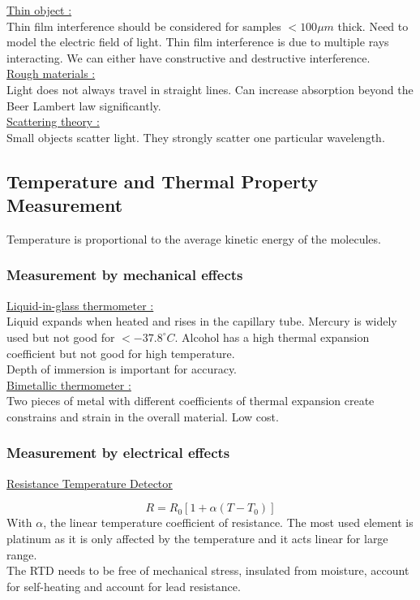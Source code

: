 \documentclass[../main.tex]{subfiles}
\begin{document}
\quad \underline{Thin object :}\\
Thin film interference should be considered for samples $<100 \mu m$ thick. Need to model the electric field of light. Thin film interference is due to multiple rays interacting. We can either have constructive and destructive interference.\\

\quad \underline{Rough materials :}\\
Light does not always travel in straight lines. Can increase absorption beyond the Beer Lambert law significantly.\\

\quad \underline{Scattering theory :}\\
Small objects scatter light. They strongly scatter one particular wavelength.\\


\subsection{Temperature and Thermal Property Measurement}
Temperature is proportional to the average kinetic energy of the molecules.\\

\subsubsection{Measurement by mechanical effects}
\quad \underline{Liquid-in-glass thermometer :}\\
Liquid expands when heated and rises in the capillary tube. Mercury is widely used but not good for $<-37.8^\circ C$. Alcohol has a high thermal expansion coefficient but not good for high temperature.\\
Depth of immersion is important for accuracy.\\

\quad \underline{Bimetallic thermometer :}\\
Two pieces of metal with different coefficients of thermal expansion create constrains and strain in the overall material. Low cost.\\

\subsubsection{Measurement by electrical effects}
\quad \underline{Resistance Temperature Detector}

\begin{equation}
    R = R_0[1+\alpha (T-T_0)]
\end{equation}
With $\alpha$, the linear temperature coefficient of resistance. The most used element is platinum as it is only affected by the temperature and it acts linear for large range.\\
The RTD needs to be free of mechanical stress, insulated from moisture, account for self-heating and account for lead resistance.\\
\end{document}
